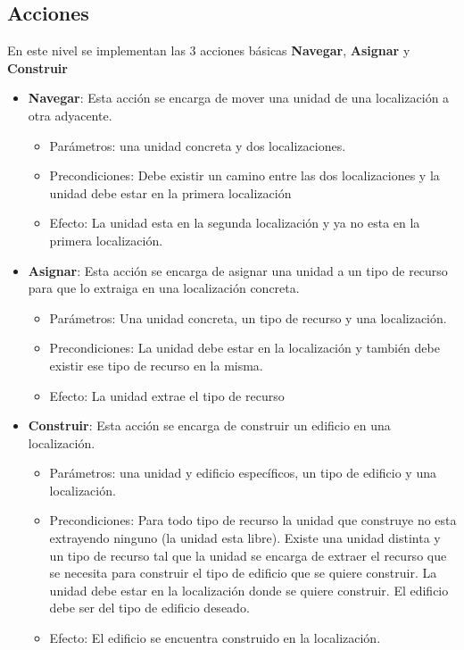 \subsection{Acciones}
En este nivel se implementan las 3 acciones básicas \textbf{Navegar}, \textbf{Asignar} y \textbf{Construir}
\begin{itemize}
   \item \textbf{Navegar}: Esta acción se encarga de mover una unidad de una localización a otra adyacente.
      \begin{itemize}
         \item Parámetros: una unidad concreta y dos localizaciones.
         \item Precondiciones: Debe existir un camino entre las dos localizaciones y la unidad debe estar en la primera localización
         \item Efecto: La unidad esta en la segunda localización y ya no esta en la primera localización.
      \end{itemize}
   \item \textbf{Asignar}: Esta acción se encarga de asignar una unidad a un tipo de recurso para que lo extraiga en una localización concreta.
   \begin{itemize}
      \item Parámetros: Una unidad concreta, un tipo de recurso y una localización.
      \item Precondiciones: La unidad debe estar en la localización y también debe existir ese tipo de recurso en la misma.
      \item Efecto: La unidad extrae el tipo de recurso
   \end{itemize}
   \item \textbf{Construir}: Esta acción se encarga de construir un edificio en una localización.
   \begin{itemize}
      \item Parámetros: una unidad y edificio específicos, un tipo de edificio y una localización.
      \item Precondiciones: Para todo tipo de recurso la unidad que construye no esta extrayendo ninguno (la unidad esta libre). Existe una unidad distinta y un tipo de recurso tal que la unidad se encarga de extraer el recurso que se necesita para construir el tipo de edificio que se quiere construir. La unidad debe estar en la localización donde se quiere construir. El edificio debe ser del tipo de edificio deseado.
      \item Efecto: El edificio se encuentra construido en la localización.
   \end{itemize}
\end{itemize}
